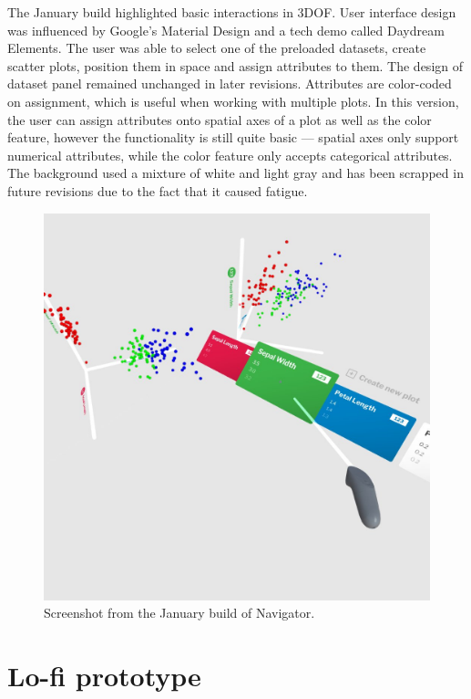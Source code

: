 \documentclass[thesis=M,english,hidelinks]{FITthesisXE}[2012/06/26]
\begin{document}
The January build highlighted basic interactions in 3DOF. User interface design was influenced by Google's Material Design\autocite{materialdesign} and a tech demo called Daydream Elements.\autocite{daydreamelements} The user was able to select one of the preloaded datasets, create scatter plots, position them in space and assign attributes to them. The design of dataset panel remained unchanged in later revisions. Attributes are color-coded on assignment, which is useful when working with multiple plots. In this version, the user can assign attributes onto spatial axes of a plot as well as the color feature, however the functionality is still quite basic --- spatial axes only support numerical attributes, while the color feature only accepts categorical attributes. The background used a mixture of white and light gray and has been scrapped in future revisions due to the fact that it caused fatigue.

\begin{figure}[ht]
\centering
\includegraphics[scale=0.2]{navigator_1901}
\caption{Screenshot from the January build of Navigator.}
\label{fig:navigator_1901}
\end{figure}

\section{Lo-fi prototype}
\end{document}

